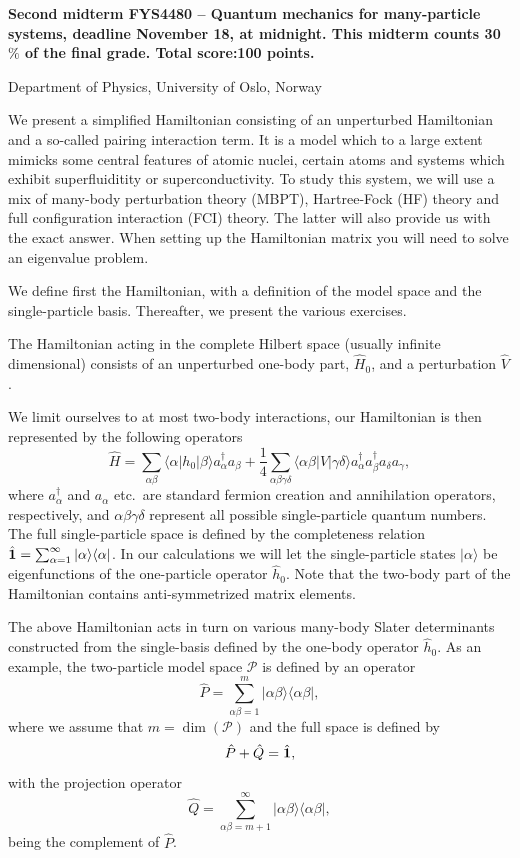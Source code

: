 \documentclass[prc]{revtex4}
\begin{document}
\begin{center}
    {\LARGE\bf
    Second midterm FYS4480 – Quantum mechanics for many-particle systems, deadline November 18, at midnight. This midterm counts 30$\%$ of the final grade. Total score:100 points.}
\end{center}
\begin{center}
    \centerline{{\small Department of Physics, University of Oslo, Norway}}
\end{center}

We present a simplified Hamiltonian consisting of an unperturbed
Hamiltonian and a so-called pairing interaction term. It is a model
which to a large extent mimicks some central features of atomic
nuclei, certain atoms and systems which exhibit superfluiditity or
superconductivity.  To study this system, we will use a mix of
many-body perturbation theory (MBPT), Hartree-Fock (HF) theory and full
configuration interaction (FCI) theory. The latter will also provide us with
the exact answer.  When setting up the Hamiltonian matrix you will
need to solve an eigenvalue problem.

We define first the Hamiltonian, with a definition of the model space
and the single-particle basis. Thereafter, we present the various
exercises.

The Hamiltonian acting in the complete Hilbert space (usually infinite
dimensional) consists of an unperturbed one-body part, $\hat{H}_0$,
and a perturbation $\hat{V}$.

We limit ourselves to at most two-body interactions, our Hamiltonian
is then represented by the following operators
\[
    \hat{H} = \sum_{\alpha\beta}\langle \alpha |h_0|\beta\rangle
    a_{\alpha}^{\dagger}a_{\beta}
    +\frac{1}{4}\sum_{\alpha\beta\gamma\delta}\langle \alpha\beta|
    V|\gamma\delta\rangle
    a_{\alpha}^{\dagger}a_{\beta}^{\dagger}a_{\delta}a_{\gamma},
\]
where $a_{\alpha}^{\dagger}$ and $a_{\alpha}$ etc.~are standard
fermion creation and annihilation operators, respectively, and
$\alpha\beta\gamma\delta$ represent all possible single-particle
quantum numbers.  The full single-particle space is defined by the
completeness relation $\hat{{\bf 1}} = \sum_{\alpha
=1}^{\infty}|\alpha \rangle \langle \alpha|$.  In our calculations
we will let the single-particle states $|\alpha\rangle$ be
eigenfunctions of the one-particle operator $\hat{h}_0$. Note that the two-body part of the Hamiltonian
contains anti-symmetrized matrix elements.

The above Hamiltonian acts in turn on various many-body Slater
determinants constructed from the single-basis defined by the one-body
operator $\hat{h}_0$.  As an example, the two-particle model space
$\mathcal{P}$ is defined by an operator
\[
    \hat{P} = \sum_{\alpha\beta =1}^{m}|\alpha\beta \rangle \langle
    \alpha\beta|,
\]
where we assume that $m=\dim(\mathcal{P})$ and the full space is
defined by
\[
    \hat{P}+\hat{Q}=\hat{{\bf 1}},
\]
with the projection operator
\[
    \hat{Q} = \sum_{\alpha\beta =m+1}^{\infty}|\alpha\beta \rangle \langle
    \alpha\beta|,
\]
being the complement of $\hat{P}$.
\end{document}
